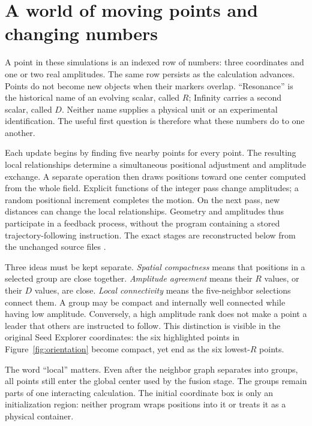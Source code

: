 \documentclass[11pt,a4paper]{article}
\begin{document}
\section{A world of moving points and changing numbers}
\label{sec:orientation}
A point in these simulations is an indexed row of numbers: three coordinates and one or two real amplitudes. The same row persists as the calculation advances. Points do not become new objects when their markers overlap. ``Resonance'' is the historical name of an evolving scalar, called $R$; Infinity carries a second scalar, called $D$. Neither name supplies a physical unit or an experimental identification. The useful first question is therefore what these numbers do to one another.

Each update begins by finding five nearby points for every point. The resulting local relationships determine a simultaneous positional adjustment and amplitude exchange. A separate operation then draws positions toward one center computed from the whole field. Explicit functions of the integer pass change amplitudes; a random positional increment completes the motion. On the next pass, new distances can change the local relationships. Geometry and amplitudes thus participate in a feedback process, without the program containing a stored trajectory-following instruction. The exact stages are reconstructed below from the unchanged source files \cite{source4,source5}.

Three ideas must be kept separate. \emph{Spatial compactness} means that positions in a selected group are close together. \emph{Amplitude agreement} means their $R$ values, or their $D$ values, are close. \emph{Local connectivity} means the five-neighbor selections connect them. A group may be compact and internally well connected while having low amplitude. Conversely, a high amplitude rank does not make a point a leader that others are instructed to follow. This distinction is visible in the original Seed Explorer coordinates: the six highlighted points in Figure~\ref{fig:orientation} become compact, yet end as the six lowest-$R$ points.

The word ``local'' matters. Even after the neighbor graph separates into groups, all points still enter the global center used by the fusion stage. The groups remain parts of one interacting calculation. The initial coordinate box is only an initialization region: neither program wraps positions into it or treats it as a physical container.
\end{document}
